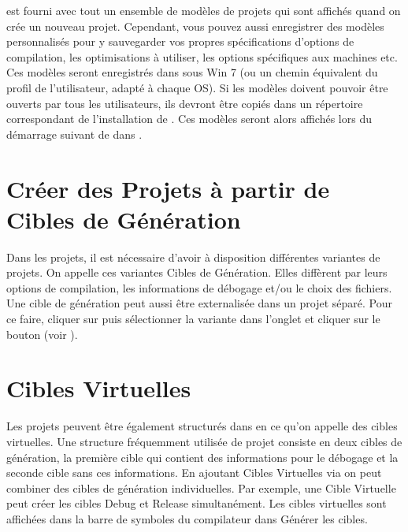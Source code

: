 \codeblocks est fourni avec tout un ensemble de modèles de projets qui sont affichés quand on crée un nouveau projet. Cependant, vous pouvez aussi enregistrer des modèles personnalisés pour y sauvegarder vos propres spécifications d'options de compilation, les optimisations à utiliser, les options spécifiques aux machines etc. Ces modèles seront enregistrés dans  sous Win 7 (ou un chemin équivalent du profil de l'utilisateur, adapté à chaque OS). Si les modèles doivent pouvoir être ouverts par tous les utilisateurs, ils devront être copiés dans un répertoire correspondant de l'installation de \codeblocks. Ces modèles seront alors affichés lors du démarrage suivant de \codeblocks dans .


\section{Créer des Projets à partir de Cibles de Génération}

Dans les projets, il est nécessaire d'avoir à disposition différentes variantes de projets. On appelle ces variantes Cibles de Génération. Elles diffèrent par leurs options de compilation, les informations de débogage et/ou le choix des fichiers. Une cible de génération peut aussi être externalisée dans un projet séparé. Pour ce faire, cliquer sur  puis sélectionner la variante dans l'onglet  et cliquer sur le bouton  (voir ).


\section{Cibles Virtuelles}

Les projets peuvent être également structurés dans \codeblocks en ce qu'on appelle des cibles virtuelles. Une structure fréquemment utilisée de projet consiste en deux cibles de génération, la première cible  qui contient des informations pour le débogage et la seconde cible  sans ces informations. En ajoutant Cibles Virtuelles via  on peut combiner des cibles de génération individuelles. Par exemple, une Cible Virtuelle  peut créer les cibles Debug et Release simultanément. Les cibles virtuelles sont affichées dans la barre de symboles du compilateur dans Générer les cibles.

